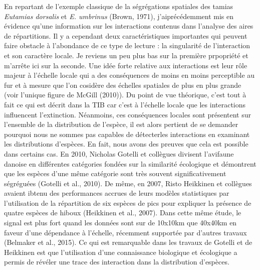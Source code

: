En repartant de l'exemple classique de la ségrégations spatiales des
tamias \emph{Eutamias dorsalis} et \emph{E. umbrinus} (Brown, 1971),
j'aiprécédemment mis en évidence qu'une information sur les interactions
contenus dans l'analyse des aires de répartitions. Il y a cependant deux
caractéristiques importantes qui peuvent faire obstacle à l'abondance de
ce type de lecture : la singularité de l'interaction et son caractère
locale. Je reviens un peu plus bas sur la première prpopriété et
m'arrête ici sur la seconde. Une idée forte relative aux interactions
est leur rôle majeur à l'échelle locale qui a des conséquences de moins
en moins perceptible au fur et à mesure que l'on cosidère des échelles
spatiales de plus en plus grande (voir l'unique figure de McGill
(2010)). Du point de vue théorique, c'est tout à fait ce qui est décrit
dans la TIB car c'est à l'échelle locale que les interactions
influencent l'extinction. Néanmoins, ces conséquences locales sont
présentent sur l'ensemble de la distribution de l'espèce, il est alors
pertient de se demander pourquoi nous ne sommes pas capables de
détecterles interactions en examinant les distributions d'espèces. En
fait, nous avons des preuves que cela est possible dans certains cas. En
2010, Nicholas Gotelli et collègues divisent l'avifaune danoise en
différentes catégories fondées sur la similarité écologique et
démontrent que les espèces d'une même catégorie sont très souvent
significativement ségréguées (Gotelli et al., 2010). De même, en 2007,
Risto Heikkinen et collègues avaient ibtenu des performances accrues de
leurs modèles statistiques par l'utilisation de la répartition de six
espèces de pics pour expliquer la présence de quatre espèces de hiboux
(Heikkinen et al., 2007). Dans cette même étude, le signal est plus fort
quand les données sont sur de 10x10km que 40x40km en faveur d'une
dépendance à l'échelle, récemment supportée par d'autres travaux
(Belmaker et al., 2015). Ce qui est remarquable dans les travaux de
Gotelli et de Heikkinen est que l'utilisation d'une connaissance
biologique et écologique a permis de révéler une trace des interaction
dans la distribution d'espèces.

